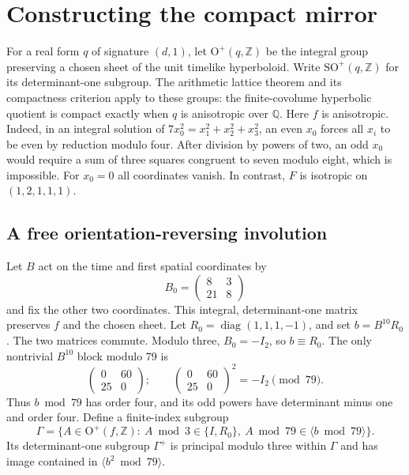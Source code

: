 \documentclass[11pt]{article}
\theoremstyle{remark}
\newcommand{\diag}{\operatorname{diag}}
\newcommand{\ZZ}{\mathbb Z}
\newcommand{\QQ}{\mathbb Q}
\newcommand{\OO}{\mathrm O}
\begin{document}
\section{Constructing the compact mirror}\label{sec:arithmetic}

For a real form \(q\) of signature \((d,1)\), let \(\OO^+(q,\ZZ)\) be the integral group preserving a chosen sheet of the unit timelike hyperboloid. Write \(\mathrm{SO}^+(q,\ZZ)\) for its determinant-one subgroup. The arithmetic lattice theorem and its compactness criterion \cite{bhc} apply to these groups: the finite-covolume hyperbolic quotient is compact exactly when \(q\) is anisotropic over \(\QQ\). Here \(f\) is anisotropic. Indeed, in an integral solution of
\(7x_0^2=x_1^2+x_2^2+x_3^2\), an even \(x_0\) forces all \(x_i\) to be even by reduction modulo four. After division by powers of two, an odd \(x_0\) would require a sum of three squares congruent to seven modulo eight, which is impossible. For \(x_0=0\) all coordinates vanish. In contrast, \(F\) is isotropic on \((1,2,1,1,1)\).

\subsection{A free orientation-reversing involution}

Let \(B\) act on the time and first spatial coordinates by
\[
 B_0=\begin{pmatrix}8&3\\21&8\end{pmatrix}
\]
and fix the other two coordinates. This integral, determinant-one matrix preserves \(f\) and the chosen sheet. Let \(R_0=\diag(1,1,1,-1)\), and set \(b=B^{10}R_0\). The two matrices commute. Modulo three, \(B_0=-I_2\), so \(b\equiv R_0\). The only nontrivial \(B^{10}\) block modulo 79 is
\[
 \begin{pmatrix}0&60\\25&0\end{pmatrix};
 \qquad
 \begin{pmatrix}0&60\\25&0\end{pmatrix}^{\!2}=-I_2\pmod {79}.
\]
Thus \(b\bmod79\) has order four, and its odd powers have determinant minus one and order four. Define a finite-index subgroup
\begin{equation}\label{eq:gamma}
 \Gamma=\{A\in\OO^+(f,\ZZ):\ A\bmod3\in\{I,R_0\},\ 
                      A\bmod79\in\langle b\bmod79\rangle\}.
\end{equation}
Its determinant-one subgroup \(\Gamma^+\) is principal modulo three within \(\Gamma\) and has image contained in \(\langle b^2\bmod79\rangle\).
\end{document}
